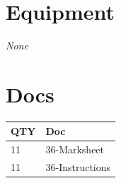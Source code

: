 \documentclass[10pt, A5]{article}
\begin{document}
\begin{framed}
\begin{minipage}{\textwidth}
        \begin{multicols}{2}

		\section*{\faWrench \: Equipment}

				\textit{None}
		
		\vfill\null
		\columnbreak

			\section*{\faFile \: Docs}
		 	\begin{center}
			\begin{tabular}{p{2cm}p{4cm}}

			\textbf{QTY} & \textbf{Doc} \\\toprule
										11&36-Marksheet\\\midrule
										11&36-Instructions\\\midrule
							\end{tabular}
			\end{center}
	

		\vfill\null

		\end{multicols}
\end{minipage}
\end{framed}
\end{document}
